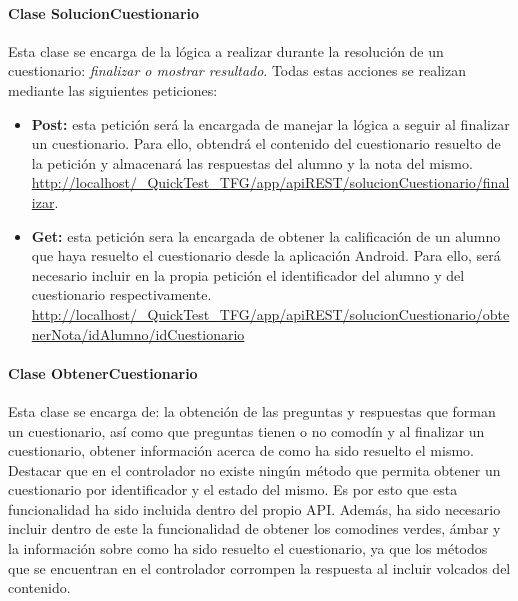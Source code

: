 
\paragraph{Clase SolucionCuestionario}

Esta clase se encarga de la lógica a realizar durante la resolución de un cuestionario: \emph{finalizar o mostrar resultado}.
Todas estas acciones se realizan mediante las siguientes peticiones:

\begin{itemize}

	\item \textbf{Post:} esta petición será la encargada de manejar la lógica a seguir al finalizar un cuestionario. Para ello, obtendrá el contenido del cuestionario resuelto de la petición y almacenará las respuestas del alumno y la nota del mismo. \url{http://localhost/_QuickTest_TFG/app/apiREST/solucionCuestionario/finalizar}.
	
	\item \textbf{Get:} esta petición sera la encargada de obtener la calificación de un alumno que haya resuelto el cuestionario desde la aplicación Android. Para ello, será necesario incluir en la propia petición el identificador del alumno y del cuestionario respectivamente. \url{http://localhost/_QuickTest_TFG/app/apiREST/solucionCuestionario/obtenerNota/idAlumno/idCuestionario}
\end{itemize}


\paragraph{Clase ObtenerCuestionario}

Esta clase se encarga de: la obtención de las preguntas y respuestas que forman un cuestionario, así como que preguntas tienen o no comodín y al finalizar un cuestionario, obtener información acerca de como ha sido resuelto el mismo. Destacar que en el controlador no existe ningún método que permita obtener un cuestionario por identificador y el estado del mismo. Es por esto que esta funcionalidad ha sido incluida dentro del propio API. Además, ha sido necesario incluir dentro de este la funcionalidad de obtener los comodines verdes, ámbar y la información sobre como ha sido resuelto el cuestionario, ya que los métodos que se encuentran en el controlador corrompen la respuesta al incluir volcados del contenido.

